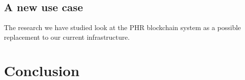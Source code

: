 \documentclass{article}
\begin{document}
\subsection{A new use case}
The research we have studied look at the PHR blockchain system as a possible replacement to our current infrastructure.

\label{industryanalysis:scalability}

\section{Conclusion}
\printbibliography
\end{document}
